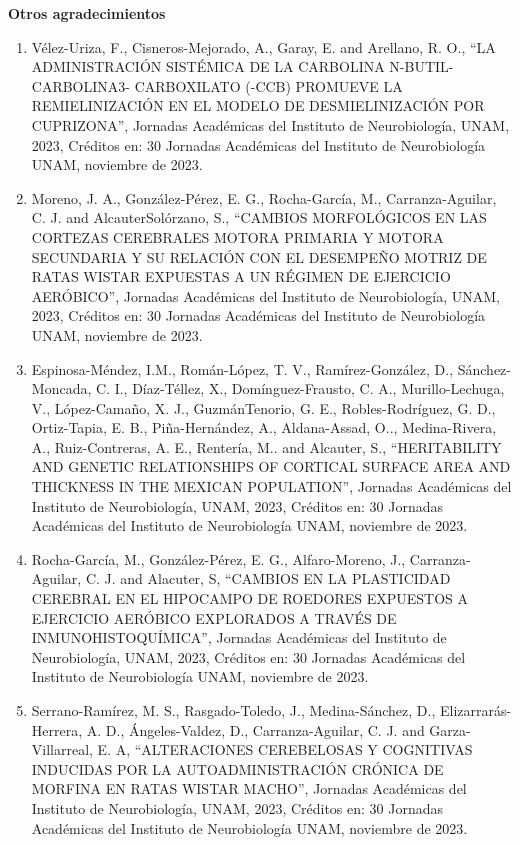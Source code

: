 \textbf{Otros agradecimientos}

\begin{enumerate}

\item Vélez-Uriza, F., Cisneros-Mejorado, A., Garay, E. and Arellano, R. O., “LA ADMINISTRACIÓN SISTÉMICA DE LA CARBOLINA N-BUTIL-CARBOLINA3- CARBOXILATO 
(-CCB) 
PROMUEVE LA REMIELINIZACIÓN EN EL MODELO DE DESMIELINIZACIÓN POR CUPRIZONA”, Jornadas Académicas del Instituto de Neurobiología, UNAM, 2023, Créditos en: 30 
Jornadas Académicas del Instituto de Neurobiología UNAM, noviembre de 2023.

\item Moreno, J. A., González-Pérez, E. G., Rocha-García, M., Carranza-Aguilar, C. J. and AlcauterSolórzano, S., “CAMBIOS MORFOLÓGICOS EN LAS CORTEZAS CEREBRALES 
MOTORA PRIMARIA Y MOTORA SECUNDARIA Y SU RELACIÓN CON EL DESEMPEÑO MOTRIZ DE RATAS WISTAR EXPUESTAS A UN RÉGIMEN DE EJERCICIO AERÓBICO”, Jornadas Académicas del 
Instituto de Neurobiología, UNAM, 2023, Créditos en: 30 Jornadas Académicas del Instituto de Neurobiología UNAM, noviembre de 2023.

\item Espinosa-Méndez, I.M., Román-López, T. V., Ramírez-González, D., Sánchez-Moncada, C. I., Díaz-Téllez, X., Domínguez-Frausto, C. A., Murillo-Lechuga, V., 
López-Camaño, X. J., GuzmánTenorio, G. E., Robles-Rodríguez, G. D., Ortiz-Tapia, E. B., Piña-Hernández, A., Aldana-Assad, O.., Medina-Rivera, A., Ruiz-Contreras, 
A. E., Rentería, M.. and Alcauter, S., “HERITABILITY AND GENETIC RELATIONSHIPS OF CORTICAL SURFACE AREA AND THICKNESS IN THE MEXICAN POPULATION”, Jornadas 
Académicas del Instituto de Neurobiología, UNAM, 2023, Créditos en: 30 Jornadas Académicas del Instituto de Neurobiología UNAM, noviembre de 2023.

\item Rocha-García, M., González-Pérez, E. G., Alfaro-Moreno, J., Carranza-Aguilar, C. J. and Alacuter, S, “CAMBIOS EN LA PLASTICIDAD CEREBRAL EN EL HIPOCAMPO DE 
ROEDORES EXPUESTOS A EJERCICIO AERÓBICO EXPLORADOS A TRAVÉS DE INMUNOHISTOQUÍMICA”, Jornadas Académicas del Instituto de Neurobiología, UNAM, 2023, Créditos en: 
30 Jornadas Académicas del Instituto de Neurobiología UNAM, noviembre de 2023.

\item Serrano-Ramírez, M. S., Rasgado-Toledo, J., Medina-Sánchez, D., Elizarrarás-Herrera, A. D., Ángeles-Valdez, D., Carranza-Aguilar, C. J. and 
Garza-Villarreal, E. 
A, “ALTERACIONES CEREBELOSAS Y COGNITIVAS INDUCIDAS POR LA AUTOADMINISTRACIÓN CRÓNICA DE MORFINA EN RATAS WISTAR MACHO”, Jornadas Académicas del Instituto de 
Neurobiología, UNAM, 2023, Créditos en: 30 Jornadas Académicas del Instituto de Neurobiología UNAM, noviembre de 2023.


\end{enumerate}

